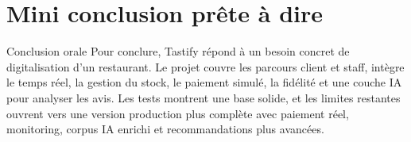\documentclass[10pt,a4paper]{article}
\begin{document}
\section{Mini conclusion prête à dire}

\begin{phrasebox}{Conclusion orale}
Pour conclure, Tastify répond à un besoin concret de digitalisation d'un restaurant. Le projet couvre les parcours client et staff, intègre le temps réel, la gestion du stock, le paiement simulé, la fidélité et une couche IA pour analyser les avis. Les tests montrent une base solide, et les limites restantes ouvrent vers une version production plus complète avec paiement réel, monitoring, corpus IA enrichi et recommandations plus avancées.
\end{phrasebox}
\end{document}
